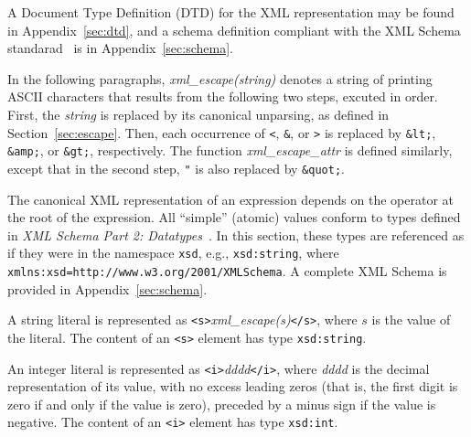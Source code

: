\documentclass{article}
\begin{document}
A Document Type Definition (DTD) for the XML representation may be found in
Appendix~\ref{sec:dtd}, and a schema definition compliant with
the XML Schema standarad~\cite{XSD-0} is in Appendix~\ref{sec:schema}.

In the following paragraphs, \emph{xml\_escape(string)} denotes a string
of printing ASCII characters that results from the following two steps,
excuted in order.  First, the \emph{string} is replaced by its canonical
unparsing, as defined in Section~\ref{sec:escape}.  Then, each occurrence
of \verb/</, \verb/&/, or \verb/>/ is replaced by \verb/&lt;/, \verb/&amp;/,
or \verb/&gt;/, respectively.  The function \emph{xml\_escape\_attr} is
defined similarly, except that in the second step, \verb/"/ is also
replaced by \verb/&quot;/.

The canonical XML representation of an expression depends on the operator at
the root of the expression.  All ``simple'' (atomic) values conform to types
defined in \emph{XML Schema Part 2: Datatypes}~\cite{XSD-2}.
In this section, these types are referenced as if they were in the namespace
\verb/xsd/, e.g., \verb/xsd:string/, where
\verb|xmlns:xsd=http://www.w3.org/2001/XMLSchema|.
A complete XML Schema is provided in Appendix~\ref{sec:schema}.

A string literal is represented as \verb|<s>|\emph{xml\_escape(s)}\verb|</s>|,
where $s$ is the value of the literal.
The content of an \verb/<s>/ element has type \verb/xsd:string/.

An integer literal is represented as \verb|<i>|\emph{dddd}\verb|</i>|, where
\emph{dddd} is the decimal representation of its value, with no excess leading
zeros (that is, the first digit is zero if and only if the value is zero),
preceded by a minus sign if the value is negative.
The content of an \verb/<i>/ element has type \verb/xsd:int/.
\end{document}
